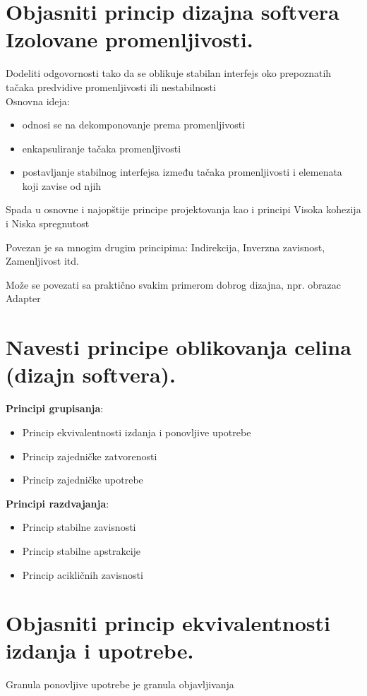 \documentclass[a4paper]{article}
\begin{document}
\section{Objasniti princip dizajna softvera Izolovane promenljivosti.}

Dodeliti odgovornosti tako da se oblikuje stabilan interfejs oko prepoznatih tačaka predvidive promenljivosti ili nestabilnosti\\

Osnovna ideja:
\begin{itemize}
   \item odnosi se na dekomponovanje prema promenljivosti
   \item enkapsuliranje tačaka promenljivosti
   \item postavljanje stabilnog interfejsa između tačaka promenljivosti i elemenata koji zavise od njih
\end{itemize}
   
Spada u osnovne i najopštije principe projektovanja kao i principi Visoka kohezija i Niska spregnutost

Povezan je sa mnogim drugim principima: Indirekcija, Inverzna zavisnost, Zamenljivost itd.

Može se povezati sa praktično svakim primerom dobrog dizajna, npr. obrazac Adapter

\section{Navesti principe oblikovanja celina (dizajn softvera).}
 \textbf{Principi grupisanja}:
\begin{itemize}
    \item Princip ekvivalentnosti izdanja i ponovljive upotrebe
    \item Princip zajedničke zatvorenosti
    \item Princip zajedničke upotrebe\\
\end{itemize}
    
   \textbf{Principi razdvajanja}:
\begin{itemize}
    \item Princip stabilne zavisnosti
    \item Princip stabilne apstrakcije
    \item Princip acikličnih zavisnosti
\end{itemize}

\section{Objasniti princip ekvivalentnosti izdanja i upotrebe.}
Granula ponovljive upotrebe je granula objavljivanja\\
\end{document}
